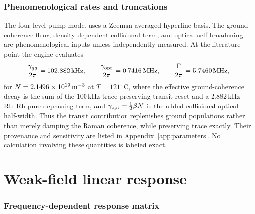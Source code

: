 \documentclass[11pt,a4paper]{article}
\newcommand{\MHz}{\,\mathrm{MHz}}
\newcommand{\kHz}{\,\mathrm{kHz}}
\newcommand{\degC}{\,^{\circ}\mathrm C}
\begin{document}
\section{Phenomenological rates and truncations}

The four-level pump model uses a Zeeman-averaged hyperfine basis. The
ground-coherence floor, density-dependent collisional term, and optical
self-broadening are phenomenological inputs unless independently measured.
At the literature point the engine evaluates
\begin{equation}
\frac{\gamma_{gg}}{2\pi}=102.882\kHz,\qquad
\frac{\gamma_{\rm opt}}{2\pi}=0.7416\MHz,\qquad
\frac{\Gamma}{2\pi}=5.7460\MHz,
\label{eq:rates-at-literature}
\end{equation}
for $N=2.1496\times10^{19}\,{\rm m^{-3}}$ at $T=121\degC$, where the effective
ground-coherence decay is the sum of the $100\kHz$ trace-preserving transit
reset and a $2.882\kHz$ Rb--Rb pure-dephasing term, and
$\gamma_{\rm opt}=\tfrac12\beta N$ is the added collisional optical half-width.
Thus the transit contribution replenishes ground populations rather than merely
damping the Raman coherence, while preserving trace exactly. Their provenance
and sensitivity are listed in
Appendix~\ref{app:parameters}. No calculation involving these quantities is
labeled exact.

\part{Weak-field linear response}

\section{Frequency-dependent response matrix}
\end{document}
